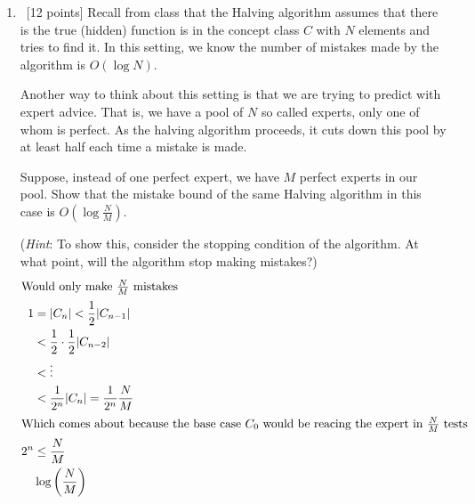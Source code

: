 \begin{enumerate}
\item ~[12 points] Recall from class that the Halving algorithm
  assumes that there is the true (hidden) function is in the concept
  class $C$ with $N$ elements and tries to find it. In this setting,
  we know the number of mistakes made by the algorithm is $O(\log N)$.

  Another way to think about this setting is that we are trying to
  predict with expert advice. That is, we have a pool of $N$ so called
  experts, only one of whom is perfect. As the halving algorithm
  proceeds, it cuts down this pool by at least half each time a
  mistake is made.

  Suppose, instead of one perfect expert, we have $M$ perfect experts
  in our pool. Show that the mistake bound of the same Halving
  algorithm in this case is $O(\log \frac{N}{M})$.
  
  ({\em Hint}: To show this, consider the stopping condition of the
  algorithm. At what point, will the algorithm stop making mistakes?)
  \begin{align}
    \intertext{Would only make $\frac{N}{M}$ mistakes}
    1 &= |C_{n}| < \frac{1}{2}|C_{n-1}|\\
      &< \frac{1}{2}\cdot \frac{1}{2} |C_{n-2}|\\
      &< \vdots\\
      &< \frac{1}{2^{n}}|C_{n}| = \frac{1}{2^{n}}\frac{N}{M}\\
      \intertext{Which comes about because the base case $C_{0}$ would be reacing the expert in $\frac{N}{M}$ tests}
      2^{n} &\leq \frac{N}{M}\\
      &\log\left(\frac{N}{M}\right)
  \end{align}
\end{enumerate}

